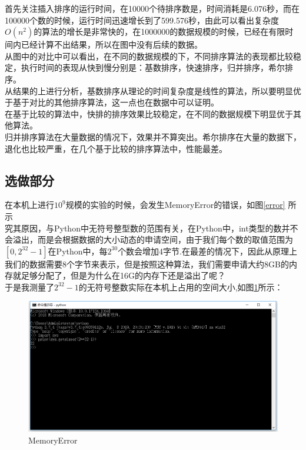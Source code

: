 \documentclass[UTF8]{ctexart}
\begin{document}
首先关注插入排序的运行时间，在10000个待排序数是，时间消耗是6.076秒，而在100000个数的时候，运行时间迅速增长到了599.576秒，由此可以看出复杂度$O(n^2)$的算法的增长是非常快的，在1000000的数据规模的时候，已经在有限时间内已经计算不出结果，所以在图中没有后续的数据。\\

从图中的对比中可以看出，在不同的数据规模的下，不同排序算法的表现都比较稳定，执行时间的表现从快到慢分别是：基数排序，快速排序，归并排序，希尔排序。\\
从结果的上进行分析，基数排序从理论的时间复杂度是线性的算法，所以要明显优于基于对比的其他排序算法，这一点也在数据中可以证明。\\
在基于比较的算法中，快排的排序效果比较稳定，在不同的数据规模下明显优于其他算法。\\
归并排序算法在大量数据的情况下，效果并不算突出。希尔排序在大量的数据下，退化也比较严重，在几个基于比较的排序算法中，性能最差。

\subsection{选做部分}

在本机上进行$10^9$规模的实验的时候，会发生MemoryError的错误，如图\ref{error} 所示\\

究其原因，与Python中无符号整型数的范围有关，在Python中，int类型的数并不会溢出，而是会根据数据的大小动态的申请空间，由于我们每个数的取值范围为$[0,2^{32}-1]$在Python中，每$2^{30}$个数会增加4字节.在最差的情况下，因此从原理上我们的数据需要8个字节来表示，但是按照这种算法，我们需要申请大约8GB的内存就足够分配了，但是为什么在16G的内存下还是溢出了呢？\\

于是我测量了$2^{32}-1$的无符号整数实际在本机上占用的空间大小,如图\ref{size}所示：

\begin{figure}[H]
    \centering
    \includegraphics[width=1\textwidth]{img/size.png}
    \caption{MemoryError}
    \label{size}
\end{figure}
\end{document}
